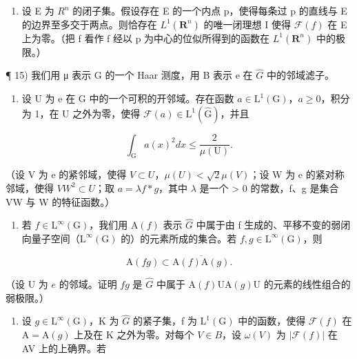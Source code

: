 \begin{enumerate}
\def\labelenumi{\arabic{enumi})}
\setcounter{enumi}{13}
\tightlist
\item
  设 E 为 \(R^{n}\) 的闭子集。假设存在 E 的一个内点 p，使得每条过 p 的直线与 E 的边界至多交于两点。则恰存在 \(L^{1}(\mathbf{R}^{n})\) 的唯一闭理想 I 使得 \(\mathcal{F}(f)\) 在 E 上为零。（把 f 看作 f 经以 p 为中心的位似所得到的函数在 \(L^{1}(\mathbf{R}^{n})\) 中的极限。）
\end{enumerate}

¶ 15) 我们用 μ 表示 G 的一个 Haar 测度，用 B 表示 e 在 \(\widehat{G}\) 中的邻域滤子。

\begin{enumerate}
\def\labelenumi{\alph{enumi})}
\tightlist
\item
  设 U 为 e 在 G 中的一个可积的开邻域。存在函数 \(a \in \mathrm{L}^{1}(\mathrm{G})\)，\(a \geqslant 0\)，积分为 1，在 U 之外为零，使得 \(\mathcal{F}(a) \in \mathrm{L}^{1}(\widehat{\mathrm{G}})\)，并且
\end{enumerate}

\[
\int_ {\mathrm{G}} a (x) ^ {2} d x \leqslant \frac {2}{\mu (\mathrm{U})}.
\]

（设 V 为 e 的紧邻域，使得 \(V \subset U\)，\(\mu(U) < \sqrt{2}\mu(V)\)；设 W 为 e 的紧对称邻域，使得 \(VW^{2} \subset U\)；取 \(a = \lambda f * g\)，其中 \(\lambda\) 是一个 \textgreater{} 0 的常数，f、g 是集合 VW 与 W 的特征函数。）

\begin{enumerate}
\def\labelenumi{\alph{enumi})}
\setcounter{enumi}{1}
\tightlist
\item
  若 \(f \in \mathrm{L}^{\infty}(\mathrm{G})\)，我们用 \(\mathrm{A}(f)\) 表示 \(\widehat{G}\) 中属于由 f 生成的、平移不变的弱闭向量子空间（\(\mathrm{L}^{\infty}(\mathrm{G})\) 的）的元素所成的集合。若 \(f, g \in \mathrm{L}^{\infty}(\mathrm{G})\)，则
\end{enumerate}

\[
\mathrm{A} (f g) \subset \overline {{\mathrm{A} (f) \mathrm{A} (g)}}.
\]

（设 U 为 \(e\) 的邻域。证明 \(fg\) 是 \(\widehat{G}\) 中属于 \(\mathrm{A}(f)\mathrm{UA}(g)\mathrm{U}\) 的元素的线性组合的弱极限。）

\begin{enumerate}
\def\labelenumi{\alph{enumi})}
\setcounter{enumi}{2}
\tightlist
\item
  设 \(g \in \mathrm{L}^{\infty}(\mathrm{G})\)，K 为 \(\widehat{G}\) 的紧子集，f 为 \(\mathrm{L}^{1}(\mathrm{G})\) 中的函数，使得 \(\mathcal{F}(f)\) 在 \(\mathrm{A} = \mathrm{A}(g)\) 上及在 K 之外为零。对每个 \(V \in B\)，设 \(\omega(V)\) 为 \(|\mathcal{F}(f)|\) 在 AV 上的上确界。若
\end{enumerate}

